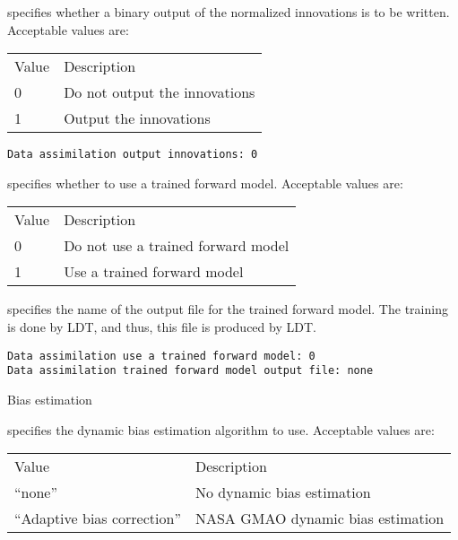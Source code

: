 
  specifies whether
 a binary output of the normalized innovations is to be written. 
 Acceptable values are:

 \begin{tabular}{ll}
 Value & Description                    \\
 0     &  Do not output the innovations \\
 1     &  Output the innovations        \\
 \end{tabular}
 

 \begin{Verbatim}[frame=single]
Data assimilation output innovations: 0
 \end{Verbatim}

 
  specifies whether
 to use a trained forward model.
 Acceptable values are:

 \begin{tabular}{ll}
 Value & Description                         \\
 0     &  Do not use a trained forward model \\
 1     &  Use a trained forward model        \\
 \end{tabular}

  specifies
 the name of the output file for the trained forward model.
 The training is done by LDT, and thus, this file is produced by LDT.
 

 \begin{Verbatim}[frame=single]
Data assimilation use a trained forward model: 0
Data assimilation trained forward model output file: none
 \end{Verbatim}

 
 Bias estimation

  specifies the dynamic bias estimation
 algorithm to use.
 Acceptable values are:

 \begin{tabular}{ll}
 Value                        & Description                       \\
 ``none''                     & No dynamic bias estimation        \\
 ``Adaptive bias correction'' & NASA GMAO dynamic bias estimation \\
 \end{tabular}
 

